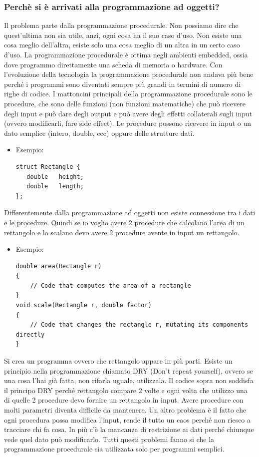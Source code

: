 \subsubsection{Perchè si è arrivati alla programmazione ad oggetti?}
Il problema parte dalla programmazione procedurale. Non possiamo dire che quest’ultima non sia utile, anzi, ogni cosa ha il suo caso d’uso. Non esiste una cosa meglio dell’altra, esiste solo una cosa meglio di un altra in un certo caso d’uso.
La programmazione procedurale è ottima negli ambienti embedded, ossia dove programmo direttamente una scheda di memoria o hardware.
Con l’evoluzione della tecnologia la programmazione procedurale non andava più bene perché i programmi sono diventati sempre più grandi in termini di numero di righe di codice.
I mattoncini principali della programmazione procedurale sono le procedure, che sono delle funzioni (non funzioni matematiche) che può ricevere degli input e può dare degli output e può avere degli effetti collaterali sugli input (ovvero modificarli, fare side effect). Le procedure possono ricevere in input o un dato semplice (intero, double, ecc) oppure delle strutture dati.

\begin{itemize}
    \item Esempio:
    \begin{lstlisting}
struct Rectangle {
   double   height;
   double   length;
};

\end{lstlisting}

\end{itemize}

Differentemente dalla programmazione ad oggetti non esiste connessione tra i dati e le procedure. Quindi se io voglio avere 2 procedure che calcolano l’area di un rettangolo e lo scalano devo avere 2 procedure avente in input un rettangolo.
\begin{itemize}
    \item Esempio:
    \begin{lstlisting}
double area(Rectangle r)
{
    // Code that computes the area of a rectangle
}
void scale(Rectangle r, double factor)
{
    // Code that changes the rectangle r, mutating its components directly
}

\end{lstlisting}

\end{itemize}

Si crea un programma ovvero che rettangolo appare in più parti. Esiste un principio nella programmazione chiamato DRY (Don’t repeat yourself), ovvero se una cosa l’hai già fatta, non rifarla uguale, utilizzala. Il codice sopra non soddisfa il principo DRY perché rettangolo compare 2 volte e ogni volta che utilizzo una di quelle 2 procedure devo fornire un rettangolo in input. Avere procedure con molti parametri diventa difficile da mantenere.
Un altro problema è il fatto che ogni procedura possa modifica l’input, rende il tutto un caos perché non riesco a tracciare chi fa cosa. In più c’è la mancanza di restrizione ai dati perché chiunque vede quel dato può modificarlo. Tutti questi problemi fanno si che la programmazione procedurale sia utilizzata solo per programmi semplici.

